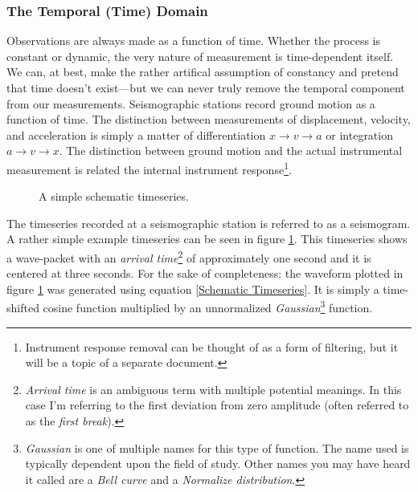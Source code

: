\documentclass[american, twoside]{article}
\begin{document}
\subsubsection{The Temporal (Time) Domain} \label{Background:Math:Temporal}
Observations are always made as a function of time. Whether the process is constant or dynamic, the very nature of measurement is time-dependent itself. We can, at best, make the
rather artifical assumption of constancy and pretend that time doesn't exist---but we can never truly remove the temporal component from our measurements. Seismographic stations
record ground motion as a function of time. The distinction between measurements of displacement, velocity, and acceleration is simply a matter of differentiation $x\rightarrow v\rightarrow a$
or integration $a\rightarrow v \rightarrow x$. The distinction between ground motion and the actual instrumental measurement is related the internal instrument response\footnote{Instrument
response removal can be thought of as a form of filtering, but it will be a topic of a separate document.}.

\begin{center}
    \begin{figure}[ht]
        \label{figure:1}
        \caption[Schematic timeseries]{A simple schematic timeseries.}
    \end{figure}
\end{center}

The timeseries recorded at a seismographic station is referred to as a seismogram. A rather simple example timeseries can be seen in figure \ref{figure:1}.
This timeseries shows a wave-packet with an \textit{arrival time}\footnote{\textit{Arrival time} is an ambiguous term with multiple
potential meanings. In this case I'm referring to the first deviation from zero amplitude (often referred to as the \textit{first break}).} of approximately one second
and it is centered at three seconds. For the sake of completeness: the waveform plotted in figure \ref{figure:1} was generated using equation \ref{Schematic Timeseries}.
It is simply a time-shifted cosine function multiplied by an unnormalized \textit{Gaussian}\footnote{\textit{Gaussian} is one of multiple names for this type of function.
The name used is typically dependent upon the field of study. Other names you may have heard it called are a \textit{Bell curve} and a \textit{Normalize distribution}.} function.
\end{document}
